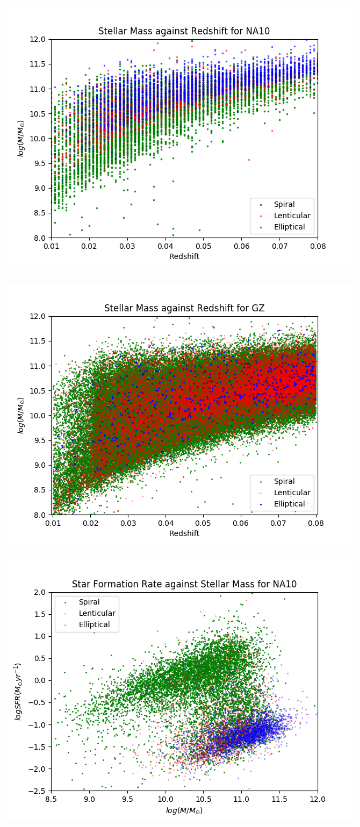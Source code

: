 \documentclass[12pt, onecolumn]{aa}
\begin{document}
\begin{figure}

    \begin{subfigure}[t]{0.499\linewidth}
    \centering
        \includegraphics[width=.85\linewidth]{Figures/property_graphs/z_NA10.png}
        \caption{}
        \label{fig:z_na}
    \end{subfigure}
    \begin{subfigure}[t]{0.499\linewidth}
    \centering
        \includegraphics[width=.85\linewidth]{Figures/property_graphs/z_GZ_2.png}
        \caption{}
        \label{fig:z_gz}
    \end{subfigure}
    \begin{subfigure}[t]{0.499\linewidth}
    \centering
        \includegraphics[width=.85\linewidth]{Figures/property_graphs/SFR_NA10.png}

\end{subfigure}
\end{figure}
\end{document}
